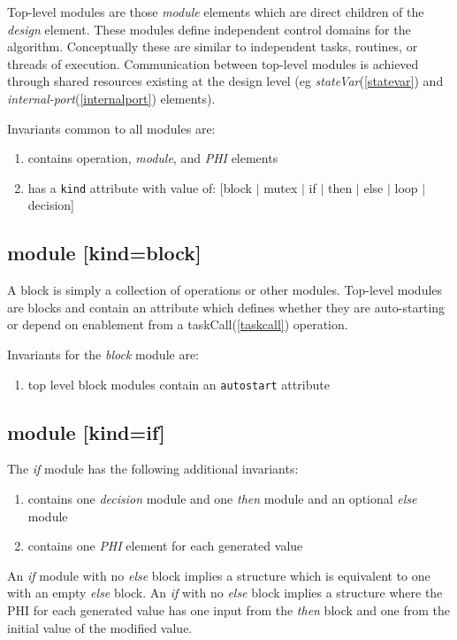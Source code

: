 Top-level modules are those {\it module} elements which are direct children of the {\it design} element.  These modules define independent control domains for the algorithm.  Conceptually these are similar to independent tasks, routines, or threads of execution.  Communication between top-level modules is achieved through shared resources existing at the design level (eg {\it stateVar}(\ref{statevar}) and {\it internal-port}(\ref{internalport}) elements).

Invariants common to all modules are:\\
\begin{enumerate}
\item contains operation, {\it module}, and {\it PHI} elements
\item has a {\tt kind} attribute with value of: [block $\mid$ mutex $\mid$ if $\mid$ then $\mid$ else $\mid$ loop $\mid$ decision]
\end{enumerate}

\subsection{module [kind=block]}
A block is simply a collection of operations or other modules.  Top-level modules are blocks and contain an attribute which defines whether they are auto-starting or depend on enablement from a taskCall(\ref{taskcall}) operation.

Invariants for the {\it block} module are:\\
\begin{enumerate}
\item top level block modules contain an {\tt autostart} attribute
\end{enumerate}

\subsection{module [kind=if]}\label{ifmodule}
The {\it if} module has the following additional invariants:\\
\begin{enumerate}
\item contains one {\it decision} module and one {\it then} module and an optional {\it else} module
\item contains one {\it PHI} element for each generated value
\end{enumerate}

An {\it if} module with no {\it else} block implies a structure which is equivalent to one with an empty {\it else} block.  An {\it if} with no {\it else} block implies a structure where the PHI for each generated value has one input from the {\it then} block and one from the initial value of the modified value.

